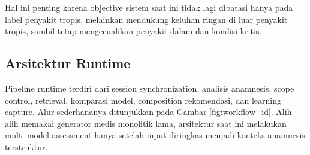 \documentclass[conference]{IEEEtran}
\begin{document}
Hal ini penting karena objective sistem saat ini tidak lagi dibatasi hanya pada label penyakit tropis, melainkan mendukung keluhan ringan di luar penyakit tropis, sambil tetap mengecualikan penyakit dalam dan kondisi kritis.

\subsection{Arsitektur Runtime}
Pipeline runtime terdiri dari session synchronization, analisis anamnesis, scope control, retrieval, komparasi model, composition rekomendasi, dan learning capture. Alur sederhananya ditunjukkan pada Gambar \ref{fig:workflow_id}. Alih-alih memakai generator medis monolitik lama, arsitektur saat ini melakukan multi-model assessment hanya setelah input diringkas menjadi konteks anamnesis terstruktur.
\end{document}
